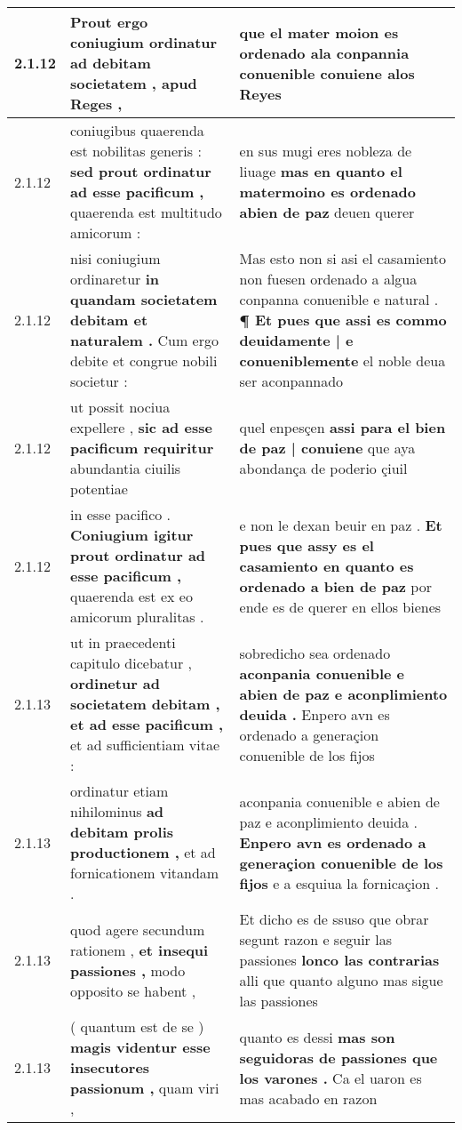 \begin{tabular}{|p{1cm}|p{6.5cm}|p{6.5cm}|}
2.1.12 & Prout ergo coniugium ordinatur \textbf{ ad debitam societatem , } apud Reges , & que el mater moion es ordenado \textbf{ ala conpannia conuenible } conuiene alos Reyes \\\hline
2.1.12 & coniugibus quaerenda est nobilitas generis : \textbf{ sed prout ordinatur ad esse pacificum , } quaerenda est multitudo amicorum : & en sus mugi eres nobleza de liuage \textbf{ mas en quanto el matermoino es ordenado abien de paz } deuen querer \\\hline
2.1.12 & nisi coniugium ordinaretur \textbf{ in quandam societatem debitam et naturalem . } Cum ergo debite et congrue nobili societur : & Mas esto non si asi el casamiento non fuesen ordenado a algua conpanna conuenible e natural . \textbf{ ¶ Et pues que assi es commo deuidamente | e conueniblemente } el noble deua ser aconpannado \\\hline
2.1.12 & ut possit nociua expellere , \textbf{ sic ad esse pacificum requiritur } abundantia ciuilis potentiae & quel enpesçen \textbf{ assi para el bien de paz | conuiene } que aya abondança de poderio çiuil \\\hline
2.1.12 & in esse pacifico . \textbf{ Coniugium igitur prout ordinatur ad esse pacificum , } quaerenda est ex eo amicorum pluralitas . & e non le dexan beuir en paz . \textbf{ Et pues que assy es el casamiento en quanto es ordenado a bien de paz } por ende es de querer en ellos bienes \\\hline
2.1.13 & ut in praecedenti capitulo dicebatur , \textbf{ ordinetur ad societatem debitam , et ad esse pacificum , } et ad sufficientiam vitae : & sobredicho sea ordenado \textbf{ aconpania conuenible e abien de paz e aconplimiento deuida . } Enpero avn es ordenado a generaçion conuenible de los fijos \\\hline
2.1.13 & ordinatur etiam nihilominus \textbf{ ad debitam prolis productionem , } et ad fornicationem vitandam . & aconpania conuenible e abien de paz e aconplimiento deuida . \textbf{ Enpero avn es ordenado a generaçion conuenible de los fijos } e a esquiua la fornicaçion . \\\hline
2.1.13 & quod agere secundum rationem , \textbf{ et insequi passiones , } modo opposito se habent , & Et dicho es de ssuso que obrar segunt razon e seguir las passiones \textbf{ lonco las contrarias } alli que quanto alguno mas sigue las passiones \\\hline
2.1.13 & ( quantum est de se ) \textbf{ magis videntur esse insecutores passionum , } quam viri , & quanto es dessi \textbf{ mas son seguidoras de passiones que los varones . } Ca el uaron es mas acabado en razon \\\hline

\end{tabular}
